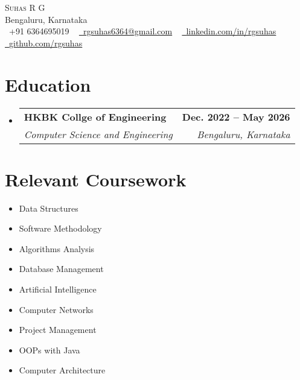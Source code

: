 \documentclass[letterpaper,11pt]{article}
\makeatletter
\newcommand{\resumeSubheading}[4]{
  \vspace{-2pt}\item
    \begin{tabular*}{1.0\textwidth}[t]{l@{\extracolsep{\fill}}r}
      \textbf{#1} & \textbf{\small #2} \\
      \textit{\small#3} & \textit{\small #4} \\
    \end{tabular*}\vspace{-7pt}
}
\newcommand{\resumeSubHeadingListStart}{\begin{itemize}[leftmargin=0.0in, label={}]}
\newcommand{\resumeSubHeadingListEnd}{\end{itemize}}
\makeatother
\begin{document}

\begin{center}
    {\Huge \scshape Suhas R G} \\ \vspace{1pt}
    Bengaluru, Karnataka \\ \vspace{1pt}
    \small \raisebox{-0.1\height}\faPhone\ +91 6364695019 ~ \href{mailto:x@gmail.com}{\raisebox{-0.2\height}\faEnvelope\  \underline{rgsuhas6364@gmail.com}} ~ 
    \href{https://linkedin.com/in//}{\raisebox{-0.2\height}\faLinkedin\ \underline{linkedin.com/in/rgsuhas}}  ~
    \href{https://github.com/}{\raisebox{-0.2\height}\faGithub\ \underline{github.com/rgsuhas}}
    \vspace{-8pt}
\end{center}


\section{Education}
  \resumeSubHeadingListStart
    \resumeSubheading
      {HKBK Collge of Engineering}{Dec. 2022 -- May 2026}
      {Computer Science and Engineering}{Bengaluru, Karnataka}
  \resumeSubHeadingListEnd

\section{Relevant Coursework}
        \begin{multicols}{4}
            \begin{itemize}[itemsep=-5pt, parsep=3pt]
                \item\small Data Structures
                \item Software Methodology
                \item Algorithms Analysis
                \item Database Management
                \item Artificial Intelligence
                \item Computer Networks
                \item Project Management
                \item OOPs with Java
                \item Computer Architecture
            \end{itemize}
        \end{multicols}
        \vspace*{2.0\multicolsep}
\end{document}
